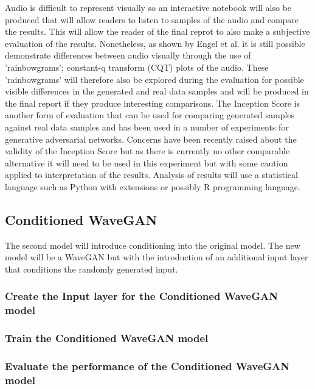 \documentclass[a4paper, titlepage]{article}
\begin{document}
Audio is difficult to represent visually so an interactive notebook will also be produced that will allow readers to listen to samples of the audio and compare the results.
This will allow the reader of the final reprot to also make a subjective evaluation of the results.
\newline
\newline
Nonetheless, as shown by Engel et al. it is still possible demonstrate differences between audio visually through the use of 'rainbowgrams'; constant-q transform (CQT) plots of the audio.
These 'rainbowgrams' will therefore also be explored during the evaluation for possible visible differences in the generated and real data samples and will be produced in the final report if they produce interesting comparisons.
\newline
\newline
The Inception Score is another form of evaluation that can be used for comparing generated samples against real data samples and has been used in a number of experiments for generative adversarial networks.
Concerns have been recently raised about the validity of the Inception Score but as there is currently no other comparable alternative it will need to be used in this experiment but with some caution applied to interpretation of the results.
\newline
\newline
Analysis of results will use a statistical language such as Python with extensions or possibly R programming language.

\subsection{Conditioned WaveGAN}

The second model will introduce conditioning into the original model.
The new model will be a WaveGAN but with the introduction of an additional input layer that conditions the randomly generated input.

\subsubsection{Create the Input layer for the Conditioned WaveGAN model}

\subsubsection{Train the Conditioned WaveGAN model}

\subsubsection{Evaluate the performance of the Conditioned WaveGAN model}
\end{document}
